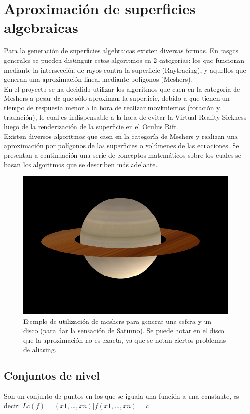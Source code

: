 \documentclass[12pt]{article}
\begin{document}
\section{Aproximación de superficies algebraicas}
Para la generación de superficies algebraicas existen diversas formas. En rasgos generales se pueden distinguir estos algoritmos en 2 categorías: los que funcionan mediante la intersección de rayos contra la superficie (Raytracing), y aquellos que generan una aproximación lineal mediante polígonos (Meshers).
\\En el proyecto se ha decidido utilizar los algoritmos que caen en la categoría de Meshers\cite{mykola1}\cite{mykola2} a pesar de que sólo aproximan la superficie, debido a que tienen un tiempo de respuesta menor a la hora de realizar movimientos (rotación y traslación), lo cual es indispensable a la hora de evitar la Virtual Reality Sickness luego de la renderización de la superficie en el Oculus Rift.
\\Existen diversos algoritmos que caen en la categoría de Meshers y realizan una aproximación por polígonos de las superficies o volúmenes de las ecuaciones. Se presentan a continuación una serie de conceptos matemáticos sobre los cuales se basan los algoritmos que se describen más adelante.
\begin{figure}[h]
\includegraphics[width=\textwidth]{saturno.png}
\caption{Ejemplo de utilización de meshers para generar una esfera y un disco (para dar la sensación de Saturno). Se puede notar en el disco que la aproximación no es exacta, ya que se notan ciertos problemas de aliasing.}
\end{figure}
\clearpage
\subsection{Conjuntos de nivel}
Son un conjunto de puntos en los que se iguala una función a una constante, es decir:
$Lc(f) = {(x1,...,xn) | f(x1,...,xn)  = c}$ \cite{implicitas}
\end{document}
